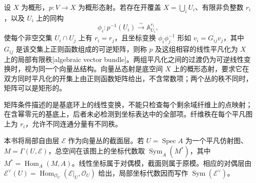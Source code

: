 \begin{definition}\label{b3:def:algebraic-vector-bundle}
	设 \(X\) 为概形，\(p:V\rightarrow X\) 为概形态射。若存在开覆盖 \(X=\bigcup_iU_i\)、有限非负整数 \(r_i\)，以及 \(U_i\) 上的同构
	\[
		\phi_i:p^{-1}(U_i)\xrightarrow{\sim}\mathbb A_{U_i}^{r_i},
	\]
	使每个非空交集 \(U_i\cap U_j\) 上有 \(r_i=r_j\)，且坐标变换 \(\phi_i\phi_j^{-1}\) 形如 \(v_i=G_{ij}v_j\)，其中 \(G_{ij}\) 是该交集上正则函数组成的可逆矩阵，则称 \(p\) 及这组相容的线性平凡化为 \(X\) 上的局部有限秩[algebraic vector bundle]。两组平凡化之间的过渡仍为可逆线性变换时，视为同一个向量丛结构。向量丛态射是底空间 \(X\) 上的概形态射，要求它在双方同时平凡化的开集上由正则函数矩阵给出，不含常数项；两个丛的秩不同时，矩阵可以是矩形的。
\end{definition}

矩阵条件描述的是基底环上的线性变换，不能只检查每个剩余域纤维上的点映射；在含幂零元的基底上，后者未必检测到坐标表达中的全部项。纤维秩在每个平凡图上为 \(r_i\)，允许不同连通分量有不同秩。

\ProseParagraphBreak
本书将局部自由层 \(\mathcal E\) 作为向量丛的截面层。若 \(U=\operatorname{Spec}A\) 为一个平凡仿射图、\(M=\Gamma(U,\mathcal E)\)，总空间在该图上的坐标代数取 \(\operatorname{Sym}_A(M^*)\)，其中 \(M^*=\operatorname{Hom}_A(M,A)\)。线性坐标属于对偶模，截面则属于原模。相应的对偶层由 \(\mathcal E^\vee(U)=\operatorname{Hom}_{\mathcal O_U}(\mathcal E|_U,\mathcal O_U)\) 给出，局部坐标代数因而写作 \(\operatorname{Sym}(\mathcal E^\vee)\)。

